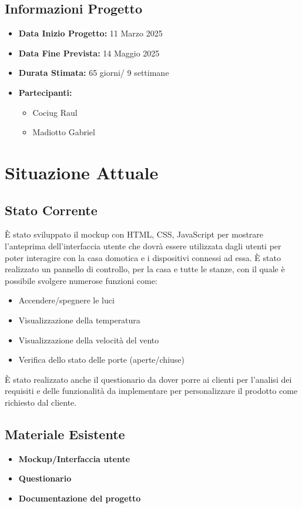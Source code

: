 \documentclass[a4paper,12pt]{article}
\begin{document}
\subsection{Informazioni Progetto}
\begin{itemize}
    \item \textbf{Data Inizio Progetto:} 11 Marzo 2025
    \item \textbf{Data Fine Prevista:} 14 Maggio 2025
    \item \textbf{Durata Stimata:} 65 giorni/ 9 settimane
    \item \textbf{Partecipanti:}
    \begin{itemize}
        \item Cociug Raul
        \item Madiotto Gabriel
    \end{itemize}
\end{itemize}

\section{Situazione Attuale}
\subsection{Stato Corrente}
È stato sviluppato il mockup con HTML, CSS, JavaScript per mostrare l'anteprima dell'interfaccia utente che dovrà essere utilizzata dagli utenti per poter interagire con la casa domotica e i dispositivi connessi ad essa.
È stato realizzato un pannello di controllo, per la casa e tutte le stanze, con il quale è possibile svolgere numerose funzioni come:\begin{itemize}
\item Accendere/spegnere le luci
\item Visualizzazione della temperatura
\item Visualizzazione della velocità del vento
\item Verifica dello stato delle porte (aperte/chiuse)
\end{itemize}
È stato realizzato anche il questionario da dover porre ai clienti per l'analisi dei requisiti e delle funzionalità da implementare per personalizzare il prodotto come richiesto dal cliente.

\subsection{Materiale Esistente}
\begin{itemize}
\item \textbf{Mockup/Interfaccia utente}
\item \textbf{Questionario}
\item \textbf{Documentazione del progetto}
\end{itemize}
\end{document}
